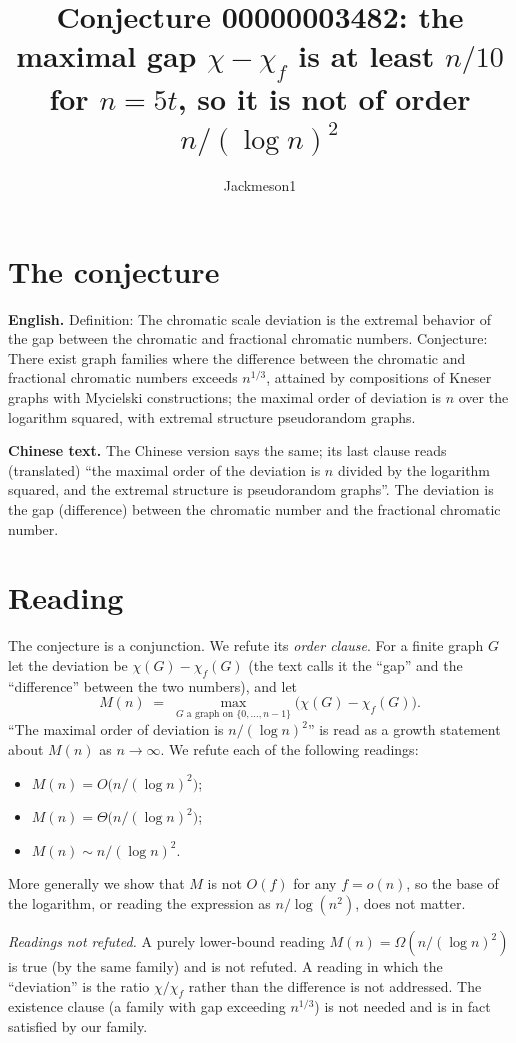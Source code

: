 \documentclass[11pt]{article}
\title{Conjecture 00000003482: the maximal gap $\chi-\chi_f$ is at least $n/10$ for $n=5t$, so it is not of order $n/(\log n)^2$}
\author{Jackmeson1}
\date{}
\theoremstyle{definition}
\theoremstyle{remark}
\begin{document}
\maketitle

\section{The conjecture}

\textbf{English.} Definition: The chromatic scale deviation is the extremal behavior of the gap
between the chromatic and fractional chromatic numbers. Conjecture: There exist graph families
where the difference between the chromatic and fractional chromatic numbers exceeds $n^{1/3}$,
attained by compositions of Kneser graphs with Mycielski constructions; the maximal order of
deviation is $n$ over the logarithm squared, with extremal structure pseudorandom graphs.

\textbf{Chinese text.} The Chinese version says the same; its last clause reads (translated) ``the
maximal order of the deviation is $n$ divided by the logarithm squared, and the extremal structure is
pseudorandom graphs''. The deviation is the gap (difference) between the chromatic number and the
fractional chromatic number.

\section{Reading}

The conjecture is a conjunction. We refute its \emph{order clause}. For a finite graph $G$ let the
deviation be $\chi(G)-\chi_f(G)$ (the text calls it the ``gap'' and the ``difference'' between the two
numbers), and let
\[
  M(n) \;=\; \max_{G \text{ a graph on } \{0,\dots,n-1\}} \bigl(\chi(G)-\chi_f(G)\bigr).
\]
``The maximal order of deviation is $n/(\log n)^2$'' is read as a growth statement about $M(n)$ as
$n\to\infty$. We refute each of the following readings:
\begin{itemize}
  \item[(O)] $M(n)=O\bigl(n/(\log n)^2\bigr)$;
  \item[($\Theta$)] $M(n)=\Theta\bigl(n/(\log n)^2\bigr)$;
  \item[($\sim$)] $M(n)\sim n/(\log n)^2$.
\end{itemize}
More generally we show that $M$ is not $O(f)$ for any $f=o(n)$, so the base of the logarithm, or
reading the expression as $n/\log(n^2)$, does not matter.

\emph{Readings not refuted.} A purely lower-bound reading $M(n)=\Omega(n/(\log n)^2)$ is true (by the
same family) and is not refuted. A reading in which the ``deviation'' is the ratio
$\chi/\chi_f$ rather than the difference is not addressed. The existence clause (a family with gap
exceeding $n^{1/3}$) is not needed and is in fact satisfied by our family.
\end{document}
